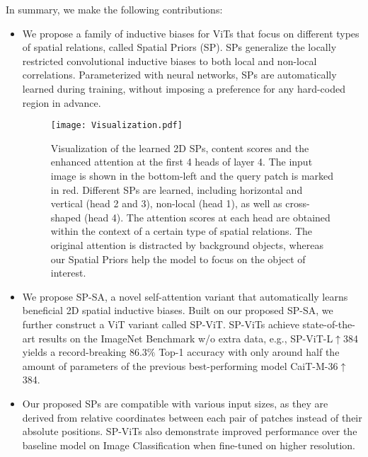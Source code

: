 \documentclass[authorversion, sigconf, acmthm=false, nonacm=true]{acmart}
\begin{document}
In summary, we make the following contributions:
\begin{itemize}
\item We propose a family of inductive biases for ViTs 
that focus on different types of spatial relations, called Spatial Priors (SP). SPs generalize the
locally restricted convolutional inductive biases
to both local and non-local correlations. Parameterized with neural networks, SPs are automatically learned
during training, without imposing a preference for any hard-coded region in advance.


\begin{figure*}[t]
  \centering
  \texttt{[image: Visualization.pdf]} \caption{Visualization of the learned 2D SPs, content scores and the enhanced attention at the first 4 heads of layer 4. The input image is shown
  in the bottom-left and the query patch is marked in red. Different SPs are learned, including
  horizontal and vertical (head 2 and 3), non-local (head 1), as well as cross-shaped (head 4).
  The attention scores at each head are obtained within the context of a certain type of spatial relations. The original attention is distracted by background objects, whereas our Spatial Priors help the model to focus on the object of interest.} 
  \label{fig3}
\end{figure*}

\item We propose SP-SA, a novel self-attention variant that automatically learns 
beneficial 2D spatial inductive biases. Built on our proposed SP-SA, we further construct a ViT variant called SP-ViT.
SP-ViTs achieve state-of-the-art results on the ImageNet Benchmark w/o extra data, e.g., SP-ViT-L$\uparrow$384 yields a record-breaking $86.3\%$
Top-1 accuracy with only around half the amount of parameters of the previous best-performing model CaiT-M-36$\uparrow$384. 

\item Our proposed SPs 
are compatible with various input sizes, as they are derived from relative coordinates between each pair of patches instead of their absolute positions. SP-ViTs also demonstrate improved performance over the baseline model on Image Classification when fine-tuned on higher resolution. 




  

\end{itemize}
\end{document}
